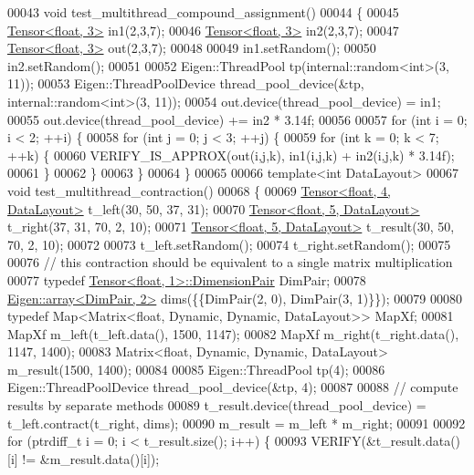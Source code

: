 \begin{DoxyCode}
00043 \textcolor{keywordtype}{void} test\_multithread\_compound\_assignment()
00044 \{
00045   \hyperlink{class_eigen_1_1_tensor}{Tensor<float, 3>} in1(2,3,7);
00046   \hyperlink{class_eigen_1_1_tensor}{Tensor<float, 3>} in2(2,3,7);
00047   \hyperlink{class_eigen_1_1_tensor}{Tensor<float, 3>} out(2,3,7);
00048 
00049   in1.setRandom();
00050   in2.setRandom();
00051 
00052   Eigen::ThreadPool tp(internal::random<int>(3, 11));
00053   Eigen::ThreadPoolDevice thread\_pool\_device(&tp, internal::random<int>(3, 11));
00054   out.device(thread\_pool\_device) = in1;
00055   out.device(thread\_pool\_device) += in2 * 3.14f;
00056 
00057   \textcolor{keywordflow}{for} (\textcolor{keywordtype}{int} i = 0; i < 2; ++i) \{
00058     \textcolor{keywordflow}{for} (\textcolor{keywordtype}{int} j = 0; j < 3; ++j) \{
00059       \textcolor{keywordflow}{for} (\textcolor{keywordtype}{int} k = 0; k < 7; ++k) \{
00060         VERIFY\_IS\_APPROX(out(i,j,k), in1(i,j,k) + in2(i,j,k) * 3.14f);
00061       \}
00062     \}
00063   \}
00064 \}
00065 
00066 \textcolor{keyword}{template}<\textcolor{keywordtype}{int} DataLayout>
00067 \textcolor{keywordtype}{void} test\_multithread\_contraction()
00068 \{
00069   \hyperlink{class_eigen_1_1_tensor}{Tensor<float, 4, DataLayout>} t\_left(30, 50, 37, 31);
00070   \hyperlink{class_eigen_1_1_tensor}{Tensor<float, 5, DataLayout>} t\_right(37, 31, 70, 2, 10);
00071   \hyperlink{class_eigen_1_1_tensor}{Tensor<float, 5, DataLayout>} t\_result(30, 50, 70, 2, 10);
00072 
00073   t\_left.setRandom();
00074   t\_right.setRandom();
00075 
00076   \textcolor{comment}{// this contraction should be equivalent to a single matrix multiplication}
00077   \textcolor{keyword}{typedef} \hyperlink{class_eigen_1_1_tensor}{Tensor<float, 1>::DimensionPair} DimPair;
00078   \hyperlink{class_eigen_1_1array}{Eigen::array<DimPair, 2>} dims(\{\{DimPair(2, 0), DimPair(3, 1)\}\});
00079 
00080   \textcolor{keyword}{typedef} Map<Matrix<float, Dynamic, Dynamic, DataLayout>> MapXf;
00081   MapXf m\_left(t\_left.data(), 1500, 1147);
00082   MapXf m\_right(t\_right.data(), 1147, 1400);
00083   Matrix<float, Dynamic, Dynamic, DataLayout> m\_result(1500, 1400);
00084 
00085   Eigen::ThreadPool tp(4);
00086   Eigen::ThreadPoolDevice thread\_pool\_device(&tp, 4);
00087 
00088   \textcolor{comment}{// compute results by separate methods}
00089   t\_result.device(thread\_pool\_device) = t\_left.contract(t\_right, dims);
00090   m\_result = m\_left * m\_right;
00091 
00092  \textcolor{keywordflow}{for} (ptrdiff\_t i = 0; i < t\_result.size(); i++) \{
00093     VERIFY(&t\_result.data()[i] != &m\_result.data()[i]);

\end{DoxyCode}

